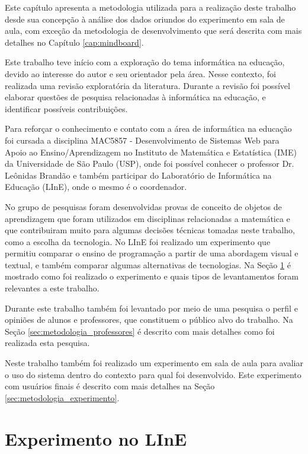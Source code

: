 Este capítulo apresenta a metodologia utilizada para a realização deste trabalho desde sua concepção à análise dos dados oriundos do experimento em sala de aula, com exceção da  metodologia de desenvolvimento que será descrita com mais detalhes no Capítulo \ref{cap:mindboard}. 

Este trabalho teve início com a exploração do tema informática na educação, devido ao interesse do autor e seu orientador pela área. Nesse contexto, foi realizada uma revisão exploratória da literatura. Durante a revisão foi possível elaborar questões de pesquisa relacionadas à informática na educação, e identificar possíveis contribuições.

Para reforçar o conhecimento e contato com a área de informática na educação foi cursada a disciplina MAC5857 - Desenvolvimento de Sistemas Web para Apoio ao Ensino/Aprendizagem no Instituto de Matemática e Estatística (IME) da Universidade de São Paulo (USP), onde foi possível conhecer o professor Dr. Leônidas Brandão e também participar do Laboratório de Informática na Educação (LInE), onde o mesmo é o coordenador.

No grupo de pesquisas foram desenvolvidas provas de conceito de objetos de aprendizagem que foram utilizados em disciplinas relacionadas a matemática e que contribuiram muito para algumas decisões técnicas tomadas neste trabalho, como a escolha da tecnologia. No LInE foi realizado um experimento que permitiu comparar o ensino de programação a partir de uma abordagem visual e textual, e também comparar algumas alternativas de tecnologias. Na Seção \ref{sec:metodologia_line} é mostrado como foi realizado o experimento e quais tipos de levantamentos foram relevantes a este trabalho.

Durante este trabalho também foi levantado por meio de uma pesquisa o perfil e opiniões de alunos e professores, que constituem o público alvo do trabalho. Na Seção \ref{sec:metodologia_professores} é descrito com mais detalhes como foi realizada esta pesquisa.

Neste trabalho também foi realizado um experimento em sala de aula para avaliar o uso do sistema dentro do contexto para qual foi desenvolvido. Este experimento com usuários finais é descrito com mais detalhes na Seção \ref{sec:metodologia_experimento}.

\section{Experimento no LInE}
\label{sec:metodologia_line}

